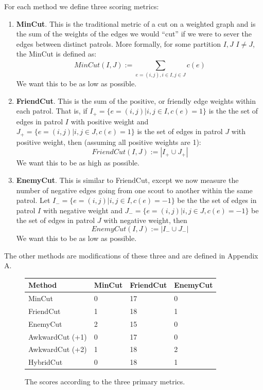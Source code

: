 \documentclass{amsart}
\theoremstyle{definition}
\theoremstyle{remark}
\numberwithin{equation}{section}
\begin{document}
\clearpage

For each method we define three scoring metrics:

\begin{enumerate}
\item \textbf{MinCut}. This is the traditional metric of a cut on a weighted graph and is the sum of the weights of the edges we would ``cut'' if we were to sever the edges between distinct patrols. More formally, for some partition $I, J$ $I \neq J$, the MinCut is defined as:
$$
MinCut(I, J) := \sum_{e = (i, j), i \in I, j \in J}^{} c(e)
$$
We want this to be as low as possible.
\item \textbf{FriendCut}. This is the sum of the positive, or friendly edge weights within each patrol. That is, if $I_+ = \{e=(i,j) | i,j \in I, c(e)=1\}$ is the the set of edges in patrol $I$ with positive weight and $J_+ = \{e=(i,j) | i,j \in J, c(e)=1\}$ is the set of edges in patrol $J$ with positive weight, then (assuming all positive weights are 1):
$$
FriendCut(I, J) :=  |I_+ \cup J_+|
$$
We want this to be as high as possible.
\item \textbf{EnemyCut}. This is similar to FriendCut, except we now measure the number of negative edges going from one scout to another within the same patrol. Let $I_- = \{e=(i,j) | i,j \in I, c(e)=-1\}$ be the the set of edges in patrol $I$ with negative weight and $J_- = \{e=(i,j) | i,j \in J, c(e)=-1\}$ be the set of edges in patrol $J$ with negative weight, then
$$
EnemyCut(I, J) := |I_- \cup J_-|
$$
    We want this to be as low as possible.
\end{enumerate}

The other methods are modifications of these three and are defined in Appendix A.

\begin{figure}[h]
    \centering
    \begin{tabular}{ |l|l|l|l| }
        \hline
        \textbf{Method} & \textbf{MinCut} & \textbf{FriendCut} & \textbf{EnemyCut} \\
        \hline
        MinCut & 0 & 17 & 0 \\
        FriendCut & 1 & 18 & 1 \\
        EnemyCut & 2 & 15 & 0 \\
        AwkwardCut (+1) & 0 & 17 & 0 \\
        AwkwardCut (+2) & 1 & 18 & 2 \\
        HybridCut & 0 & 18 & 1 \\
        \hline
    \end{tabular}
    \caption{The scores according to the three primary metrics.}
\end{figure}
\end{document}
